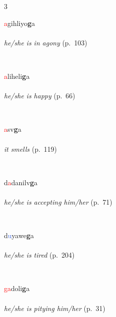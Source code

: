 \documentclass[oneside,openany]{book}%
\begin{document}
\noindent\begin{multicols}{3}%
\begin{minipage}[t]{\linewidth}
\raggedright\noindent \textcolor{Red}{a}gihliyo\textbf{g}a\\
\\
\noindent \textit{he/she is in agony} (p.~103)
\end{minipage}\\[1em]%
\begin{minipage}[t]{\linewidth}
\raggedright\noindent \textcolor{Red}{a}liheli\textbf{g}a\\
\\
\noindent \textit{he/she is happy} (p.~66)
\end{minipage}\\[1em]%
\begin{minipage}[t]{\linewidth}
\raggedright\noindent \textcolor{Red}{a}sv\textbf{g}a\\
\\
\noindent \textit{it smells} (p.~119)
\end{minipage}\\[1em]%
\begin{minipage}[t]{\linewidth}
\raggedright\noindent d\textcolor{Red}{a}danilv\textbf{g}a\\
\\
\noindent \textit{he/she is accepting him/her} (p.~71)
\end{minipage}\\[1em]%
\begin{minipage}[t]{\linewidth}
\raggedright\noindent d\textcolor{RoyalBlue}{u}yawe\textbf{g}a\\
\\
\noindent \textit{he/she is tired} (p.~204)
\end{minipage}\\[1em]%
\begin{minipage}[t]{\linewidth}
\raggedright\noindent \textcolor{Red}{ga}doli\textbf{g}a\\
\\
\noindent \textit{he/she is pitying him/her} (p.~31)

\end{minipage}
\end{multicols}
\end{document}
